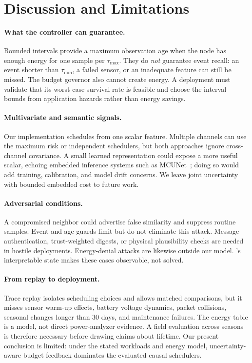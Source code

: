 \section{Discussion and Limitations}
\label{sec:discussion}

\paragraph{What the controller can guarantee.}
Bounded intervals provide a maximum observation age when the node has enough
energy for one sample per $\tau_{\max}$.  They do \emph{not} guarantee event
recall: an event shorter than $\tau_{\min}$, a failed sensor, or an inadequate
feature can still be missed.  The budget governor also cannot create energy.
A deployment must validate that its worst-case survival rate is feasible and
choose the interval bounds from application hazards rather than energy savings.

\paragraph{Multivariate and semantic signals.}
Our implementation schedules from one scalar feature.  Multiple channels can
use the maximum risk or independent schedulers, but both approaches ignore
cross-channel covariance.  A small learned representation could expose a more
useful scalar, echoing embedded inference systems such as
MCUNet~\cite{lin2020mcunet}; doing so would add training, calibration, and model
drift concerns.  We leave joint uncertainty with bounded embedded cost to
future work.

\paragraph{Adversarial conditions.}
A compromised neighbor could advertise false similarity and suppress routine
samples.  Event and age guards limit but do not eliminate this attack.  Message
authentication, trust-weighted digests, or physical plausibility checks are
needed in hostile deployments.  Energy-denial attacks are likewise outside our
model.  \system's interpretable state makes these cases observable, not solved.

\paragraph{From replay to deployment.}
Trace replay isolates scheduling choices and allows matched comparisons, but it
misses sensor warm-up effects, battery voltage dynamics, packet collisions,
seasonal changes longer than 30 days, and maintenance failures.  The energy
table is a model, not direct power-analyzer evidence.  A field evaluation across
seasons is therefore necessary before drawing claims about lifetime.  Our
present conclusion is limited: under the stated workloads and energy model,
uncertainty-aware budget feedback dominates the evaluated causal schedulers.
